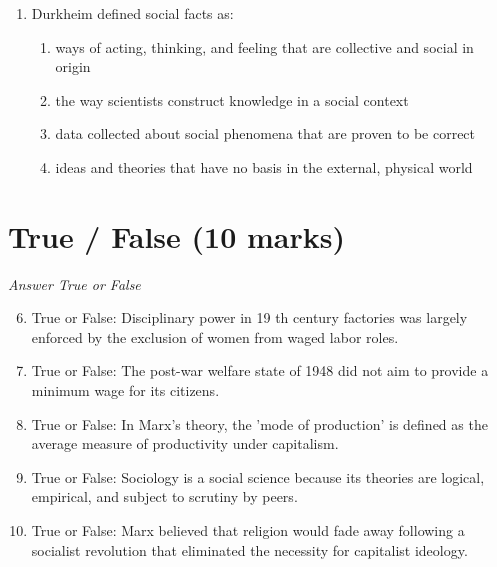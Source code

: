 \documentclass[12pt]{article}
\begin{document}
\begin{enumerate}[label=\arabic*.]
\begin{enumerate}[label=(\alph*)]
    \item highly specialized, interrelated sets of social practices
    \item disorganized social relations in a postmodern world
    \item virtual communities in cyberspace
    \item no longer relevant to sociology
\end{enumerate}
\item Durkheim defined social facts as:
\begin{enumerate}[label=(\alph*)]
    \item ways of acting, thinking, and feeling that are collective and social in origin
    \item the way scientists construct knowledge in a social context
    \item data collected about social phenomena that are proven to be correct
    \item ideas and theories that have no basis in the external, physical world
\end{enumerate}
\end{enumerate}

\section*{True / False (10 marks)}
\textit{Answer True or False}
\begin{enumerate}[label=\arabic*.]
\setcounter{enumi}{5}
\item True or False: Disciplinary power in 19 th century factories was largely enforced by the exclusion of women from waged labor roles.
\item True or False: The post-war welfare state of 1948 did not aim to provide a minimum wage for its citizens.
\item True or False: In Marx's theory, the 'mode of production' is defined as the average measure of productivity under capitalism.
\item True or False: Sociology is a social science because its theories are logical, empirical, and subject to scrutiny by peers.
\item True or False: Marx believed that religion would fade away following a socialist revolution that eliminated the necessity for capitalist ideology.
\end{enumerate}
\end{document}

